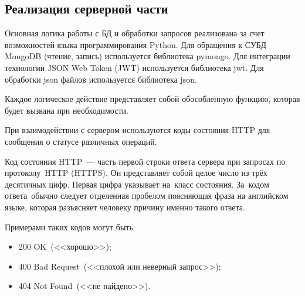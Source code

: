 \clearpage
\subsection{Реализация серверной части}
Основная логика работы с БД и обработки запросов реализована за счет возможностей языка программирования Python.
Для обращения к СУБД MongoDB (чтение, запись) используется библиотека pymongo. Для интеграции технологии JSON Web Token (JWT) используется библиотека jwt.
Для обработки json файлов используется библиотека json.

Каждое логическое действие представляет собой обособленную функцию, которая будет вызвана при необходимости.







При взаимодействии с сервером используются коды состояния HTTP для сообщения о статусе различных операций.
\begin{definition}
    Код состояния HTTP --- часть первой строки ответа сервера при запросах по протоколу HTTP (HTTPS).
    Он представляет собой целое число из трёх десятичных цифр. Первая цифра указывает на класс состояния.
    За кодом ответа обычно следует отделенная пробелом поясняющая фраза на английском языке, которая разъясняет человеку причину именно такого ответа.
\end{definition}

Примерами таких кодов могут быть:
\begin{itemize}
    \item 200 OK (<<хорошо>>);
    \item 400 Bad Request (<<плохой или неверный запрос>>);
    \item 404 Not Found (<<не найдено>>).
\end{itemize}



